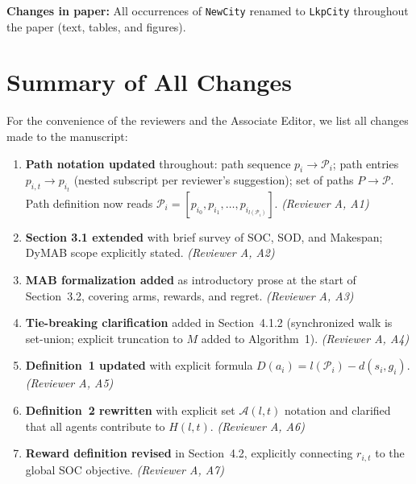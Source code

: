\documentclass[review]{jair}
\begin{document}
\begin{changebox}
\textbf{Changes in paper:} All occurrences of \texttt{NewCity} renamed to \texttt{LkpCity} throughout the paper (text, tables, and figures).
\end{changebox}

\section*{Summary of All Changes}

For the convenience of the reviewers and the Associate Editor, we list all changes made to the manuscript:

\begin{enumerate}[leftmargin=2em, label=\textbf{C\arabic*}]

  \item \textbf{Path notation updated} throughout: path sequence $p_i \to \mathcal{P}_i$; path entries $p_{i,t} \to p_{i_t}$ (nested subscript per reviewer's suggestion); set of paths $P \to \mathcal{P}$. Path definition now reads $\mathcal{P}_i = [p_{i_0}, p_{i_1}, \ldots, p_{i_{l(\mathcal{P}_i)}}]$. \emph{(Reviewer A, A1)}

  \item \textbf{Section 3.1 extended} with brief survey of SOC, SOD, and Makespan; DyMAB scope explicitly stated. \emph{(Reviewer A, A2)}

  \item \textbf{MAB formalization added} as introductory prose at the start of Section~3.2, covering arms, rewards, and regret. \emph{(Reviewer A, A3)}

  \item \textbf{Tie-breaking clarification} added in Section~4.1.2 (synchronized walk is set-union; explicit truncation to $M$ added to Algorithm~1). \emph{(Reviewer A, A4)}

  \item \textbf{Definition~1 updated} with explicit formula $D(a_i) = l(\mathcal{P}_i) - d(s_i, g_i)$. \emph{(Reviewer A, A5)}

  \item \textbf{Definition~2 rewritten} with explicit set $\mathcal{A}(l,t)$ notation and clarified that all agents contribute to $H(l,t)$. \emph{(Reviewer A, A6)}

  \item \textbf{Reward definition revised} in Section~4.2, explicitly connecting $r_{i,t}$ to the global SOC objective. \emph{(Reviewer A, A7)}


\end{enumerate}
\end{document}
